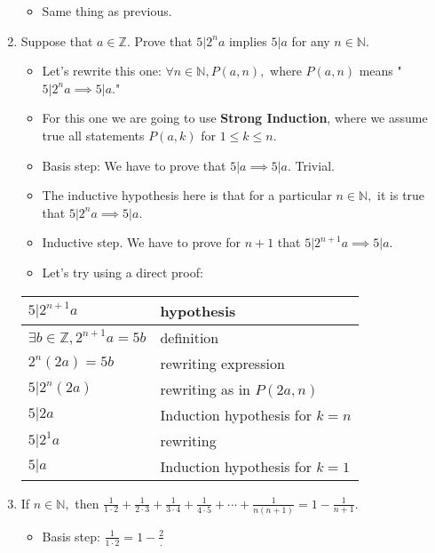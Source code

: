\documentclass[11pt, oneside]{amsart}
\begin{document}
\begin{enumerate}
\label{sec:org34a66d5}
\begin{itemize}
\item Same thing as previous.
\end{itemize}
\item Suppose that \(a \in \mathbb{Z}.\) Prove that \(5 \vert 2^n a\) implies \(5 \vert a\) for any \(n \in \mathbb{N}.\)
\label{sec:org785f3e2}
\begin{itemize}
\item Let's rewrite this one: \(\forall n \in \mathbb{N}, P(a,n),\) where \(P(a,n)\) means "\(5 \vert 2^n a
      \implies 5 \vert a.\)"
\item For this one we are going to use \textbf{Strong Induction}, where we assume true all statements \(P(a,k)\) for \(1
      \leq k \leq n.\)
\item Basis step: We have to prove that \(5 \vert a \implies 5 \vert a\).  Trivial.
\item The inductive hypothesis here is that for a particular \(n \in \mathbb{N},\) it is true that \(5 \vert 2^n a
      \implies 5 \vert a.\)
\item Inductive step.  We have to prove for \(n+1\) that \(5 \vert 2^{n+1} a \implies 5 \vert a.\)
\item Let's try using a direct proof:
\end{itemize}
\begin{center}
\begin{tabular}{|l|l|}
\hline
\(5 \vert 2^{n+1}a\) & hypothesis\\
\hline
\(\exists b \in \mathbb{Z}, 2^{n+1}a = 5b\) & definition\\
\hline
\(2^{n}(2a) = 5b\) & rewriting expression\\
\hline
\(5 \vert 2^{n} (2a)\) & rewriting as in \(P(2a,n)\)\\
\hline
\(5 \vert 2a\) & Induction hypothesis for \(k=n\)\\
\hline
\(5 \vert 2^{1}a\) & rewriting\\
\hline
\(5 \vert a\) & Induction hypothesis for \(k=1\)\\
\hline
\end{tabular}
\end{center}
\item If \(n \in \mathbb{N},\) then \(\frac{1}{1\cdot 2} + \frac{1}{2\cdot 3} + \frac{1}{3\cdot 4} + \frac{1}{4\cdot 5} + \dotsb + \frac{1}{n(n+1)} = 1 - \frac{1}{n+1}.\)
\label{sec:org62b53e5}
\begin{itemize}
\item Basis step: \(\frac{1}{1\cdot 2} = 1 - \frac{2}.\)

\end{itemize}
\end{enumerate}
\end{document}
